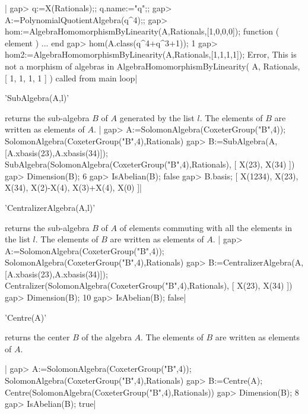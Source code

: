 |    gap> q:=X(Rationals);; q.name:="q";;
    gap> A:=PolynomialQuotientAlgebra(q^4);;
    gap> hom:=AlgebraHomomorphismByLinearity(A,Rationals,[1,0,0,0]);
    function ( element ) ... end
    gap> hom(A.class(q^4+q^3+1));
    1
    gap> hom2:=AlgebraHomomorphismByLinearity(A,Rationals,[1,1,1,1]);
    Error, This is not a morphism of algebras in
    AlgebraHomomorphismByLinearity( A, Rationals, [ 1, 1, 1, 1 ] ) called from
    main loop|

'SubAlgebra(A,l)'

returns  the sub-algebra $B$ of $A$ generated by the list $l$. The elements
of $B$ are written as elements of $A$.
|    gap> A:=SolomonAlgebra(CoxeterGroup("B",4));
    SolomonAlgebra(CoxeterGroup("B",4),Rationals)
    gap> B:=SubAlgebra(A,[A.xbasis(23),A.xbasis(34)]);
    SubAlgebra(SolomonAlgebra(CoxeterGroup("B",4),Rationals),
    [ X(23), X(34) ])
    gap> Dimension(B);
    6
    gap> IsAbelian(B);
    false
    gap> B.basis;
    [ X(1234), X(23), X(34), X(2)-X(4), X(3)+X(4), X(0) ]|

'CentralizerAlgebra(A,l)'

returns  the  sub-algebra  $B$  of  $A$  of elements commuting with all the
elements  in the list $l$.  The elements of $B$  are written as elements of
$A$.
|    gap> A:=SolomonAlgebra(CoxeterGroup("B",4));
    SolomonAlgebra(CoxeterGroup("B",4),Rationals)
    gap> B:=CentralizerAlgebra(A,[A.xbasis(23),A.xbasis(34)]);
    Centralizer(SolomonAlgebra(CoxeterGroup("B",4),Rationals),
    [ X(23), X(34) ])
    gap> Dimension(B);
    10
    gap> IsAbelian(B);
    false|

'Centre(A)'

returns  the center $B$ of the algebra $A$. The elements of $B$ are written
as elements of $A$.

|    gap> A:=SolomonAlgebra(CoxeterGroup("B",4));
    SolomonAlgebra(CoxeterGroup("B",4),Rationals)
    gap> B:=Centre(A);
    Centre(SolomonAlgebra(CoxeterGroup("B",4),Rationals))
    gap> Dimension(B);
    8
    gap> IsAbelian(B);
    true|


